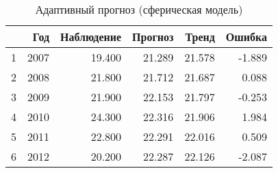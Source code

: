 \begin{table}[ht]
\centering
\begin{tabular}{rrrrrr}
  \hline
 & Год & Наблюдение & Прогноз & Тренд & Ошибка \\ 
  \hline
1 & 2007 & 19.400 & 21.289 & 21.578 & -1.889 \\ 
  2 & 2008 & 21.800 & 21.712 & 21.687 & 0.088 \\ 
  3 & 2009 & 21.900 & 22.153 & 21.797 & -0.253 \\ 
  4 & 2010 & 24.300 & 22.316 & 21.906 & 1.984 \\ 
  5 & 2011 & 22.800 & 22.291 & 22.016 & 0.509 \\ 
  6 & 2012 & 20.200 & 22.287 & 22.126 & -2.087 \\ 
   \hline
\end{tabular}
\caption{Адаптивный прогноз (сферическая модель)} 
\label{table:sph-fit-adapt-prediction}
\end{table}
